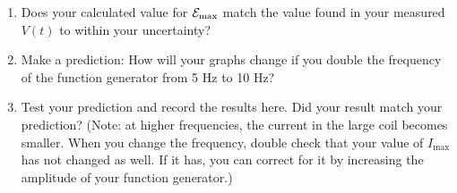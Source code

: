 \begin{enumerate}[labparts]
\answerspace{0.75in}

\item Does your calculated value for $\mathcal{E}_{\rm max}$ match the value found in your measured $V(t)$ to within your uncertainty?
\answerspace{0.75in}

\item Make a prediction: How will your graphs change if you double the frequency of the function generator from 5 Hz to 10 Hz? 
\answerspace{0.75in}

\item Test your prediction and record the results here.  Did your result match your prediction?   (Note: at higher frequencies, the current in the large coil becomes smaller.  When you change the frequency, double check that your value of $I_\text{max}$ has not changed as well. If it has, you can correct for it by increasing the amplitude of your function generator.)
\answerspace{0.75in}


\end{enumerate}

